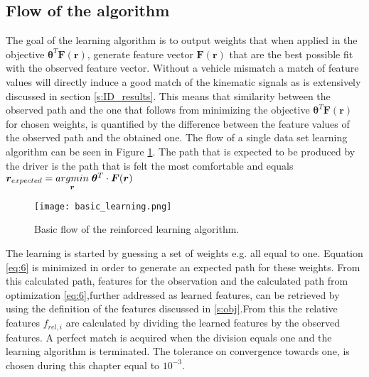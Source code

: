 \subsection{Flow of the algorithm}
The goal of the learning algorithm is to output weights that when applied in the objective $\bm{\theta}^T\bm{F}(\bm{r})$, generate feature vector  $\bm{F(\bm{r})}$ that are the best possible fit with the observed feature vector. Without a vehicle mismatch a match of feature values will directly induce a good match of the kinematic signals as is extensively discussed in section \ref{s:ID_results}. This means that similarity between the observed path and the one that follows from minimizing the objective $\bm{\theta}^T\bm{F}(\bm{r})$ for chosen weights, is quantified by the difference between the feature values of the observed path and the obtained one. The flow of a single data set learning algorithm can be seen in Figure \ref{fig:basic learning}. The path that is expected to be produced by the driver is the path that is felt the most comfortable and equals $\bm{r}_{expected} =  \underset{\bm{r}}{argmin} \hspace{1mm}  \bm{\theta}^T\cdot \bm{F}(\bm{r})$

\begin{figure}[h!]
	\centering
	\texttt{[image: basic\_learning.png]}
	\caption{Basic flow of the reinforced learning algorithm.}
	\label{fig:basic learning}
\end{figure}

The learning is started by guessing a set of weights e.g. all equal to one. Equation \ref{eq:6} is minimized in order to generate an expected path for these weights. From this calculated path, features for the observation and the calculated path from optimization \ref{eq:6},further addressed as learned features, can be retrieved by using the definition of the features discussed in \ref{s:obj}.From this the relative features $f_{rel,i}$ are calculated by dividing the learned features by the observed features. A perfect match is acquired when the division equals one and the learning algorithm is terminated. The tolerance on convergence towards one, is chosen during this chapter equal to $10^{-3}$.  


